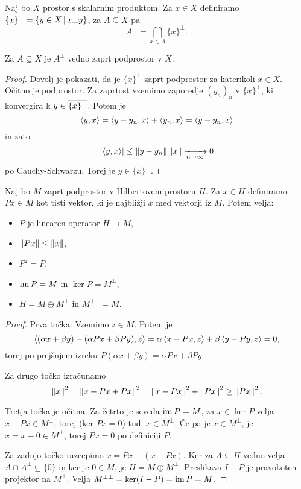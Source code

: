 \begin{definicija}
  Naj bo $X$ prostor s skalarnim produktom.
  Za $x \in X$ definiramo $\{x\}^\bot = \{y \in X \,|\, x \bot y\}$, za $A
  \subseteq X$ pa
  \[
	A^\bot = \bigcap_{x \in A} \{x\}^\bot.
  \]
\end{definicija}

\begin{lema}
  Za $A \subseteq X$ je $A^\bot$ vedno zaprt podprostor v $X$.
\end{lema}

\begin{proof}
  Dovolj je pokazati, da je $\{x\}^\bot$ zaprt podprostor za katerikoli $x \in
  X$.
  Očitno je podprostor.
  Za zaprtost vzemimo zaporedje $(y_n)_n$ v $\{x\}^\bot$, ki konvergira k $y \in
  \overline{\{x\}^\bot}$.
  Potem je
  \[
	\left< y,x \right> = \left< y - y_n, x \right> + \left< y_n, x \right> = \left< y - y_n, x \right>
  \]
  in zato
  \[
	\left| \left< y, x \right> \right| \le \left\lVert y - y_n\right\rVert \left\lVert x\right\rVert \xrightarrow[n \to \infty]{} 0
  \]
  po Cauchy-Schwarzu.
  Torej je $y \in \{x\}^\bot$.
\end{proof}

\begin{izrek}
  Naj bo $M$ zaprt podprostor v Hilbertovem prostoru $H$.
  Za $x \in H$ definiramo $Px \in M$ kot tisti vektor, ki je najbližji $x$ med
  vektorji iz $M$.
  Potem velja:
  \begin{itemize}
  \item $P$ je linearen operator $H \to M$,
  \item $\left\lVert Px\right\rVert \le \left\lVert x\right\rVert$,
  \item $P^2 = P$,
  \item $\operatorname{im} P = M$ in $\ker P = M^\bot$,
  \item $H = M \oplus M^\bot$ in $M^{\bot \bot} = M$.
  \end{itemize}
\end{izrek}

\begin{proof}
  Prva točka:
  Vzemimo $z \in M$.
  Potem je
  \[
	\left< (\alpha x + \beta y) - (\alpha Px + \beta Py), z \right>
	= \alpha \left< x - Px, z \right> + \beta \left< y - Py, z \right>
	= 0,
  \]
  torej po prejšnjem izreku $P(\alpha x + \beta y) = \alpha P x + \beta P y$.

  Za drugo točko izračunamo
  \[
	\left\lVert x\right\rVert^2 = \left\lVert x - Px + Px\right\rVert^2 = \left\lVert x - Px\right\rVert^2 + \left\lVert Px\right\rVert^2 \ge
	\left\lVert Px\right\rVert^2.
  \]

  Tretja točka je očitna.
  Za četrto je seveda $\operatorname{im} P = M$, za $x \in \ker P$ velja $x - Px \in M^\bot$,
  torej (ker $Px = 0$) tudi $x \in M^\bot$.
  Če pa je $x \in M^\bot$, je $x = x - 0 \in M^\bot$, torej $Px = 0$ po
  definiciji $P$.

  Za zadnjo točko razcepimo $x = Px + (x -Px)$.
  Ker za $A \subseteq H$ vedno velja $A \cap A^\bot \subseteq \{0\}$ in ker je
  $0 \in M$, je $H = M \oplus M^\bot$.
  Preslikava $I - P$ je pravokoten projektor na $M^\bot$.
  Velja $M^{\bot \bot} = \operatorname{ker} (I-P) = \operatorname{im} P = M$.
\end{proof}

